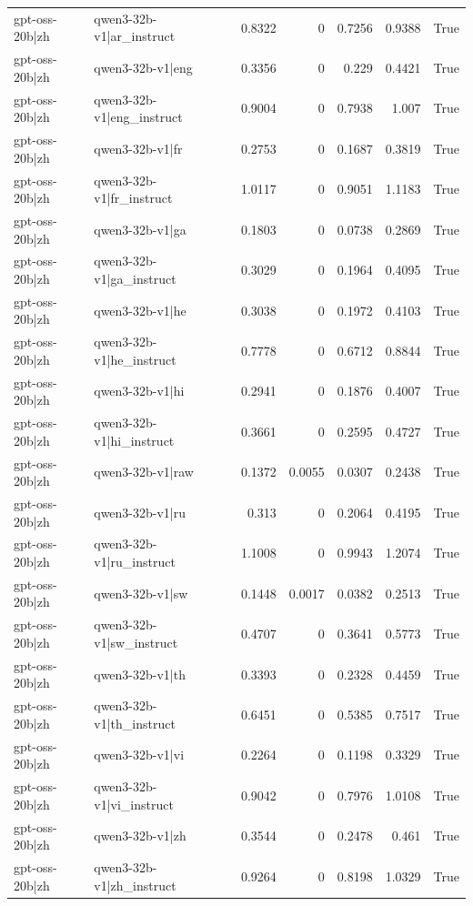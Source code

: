\begin{table}
\begin{tabular}{l l r r r r l}
gpt-oss-20b|zh & qwen3-32b-v1|ar_instruct & 0.8322 & 0 & 0.7256 & 0.9388 & True \\
gpt-oss-20b|zh & qwen3-32b-v1|eng & 0.3356 & 0 & 0.229 & 0.4421 & True \\
gpt-oss-20b|zh & qwen3-32b-v1|eng_instruct & 0.9004 & 0 & 0.7938 & 1.007 & True \\
gpt-oss-20b|zh & qwen3-32b-v1|fr & 0.2753 & 0 & 0.1687 & 0.3819 & True \\
gpt-oss-20b|zh & qwen3-32b-v1|fr_instruct & 1.0117 & 0 & 0.9051 & 1.1183 & True \\
gpt-oss-20b|zh & qwen3-32b-v1|ga & 0.1803 & 0 & 0.0738 & 0.2869 & True \\
gpt-oss-20b|zh & qwen3-32b-v1|ga_instruct & 0.3029 & 0 & 0.1964 & 0.4095 & True \\
gpt-oss-20b|zh & qwen3-32b-v1|he & 0.3038 & 0 & 0.1972 & 0.4103 & True \\
gpt-oss-20b|zh & qwen3-32b-v1|he_instruct & 0.7778 & 0 & 0.6712 & 0.8844 & True \\
gpt-oss-20b|zh & qwen3-32b-v1|hi & 0.2941 & 0 & 0.1876 & 0.4007 & True \\
gpt-oss-20b|zh & qwen3-32b-v1|hi_instruct & 0.3661 & 0 & 0.2595 & 0.4727 & True \\
gpt-oss-20b|zh & qwen3-32b-v1|raw & 0.1372 & 0.0055 & 0.0307 & 0.2438 & True \\
gpt-oss-20b|zh & qwen3-32b-v1|ru & 0.313 & 0 & 0.2064 & 0.4195 & True \\
gpt-oss-20b|zh & qwen3-32b-v1|ru_instruct & 1.1008 & 0 & 0.9943 & 1.2074 & True \\
gpt-oss-20b|zh & qwen3-32b-v1|sw & 0.1448 & 0.0017 & 0.0382 & 0.2513 & True \\
gpt-oss-20b|zh & qwen3-32b-v1|sw_instruct & 0.4707 & 0 & 0.3641 & 0.5773 & True \\
gpt-oss-20b|zh & qwen3-32b-v1|th & 0.3393 & 0 & 0.2328 & 0.4459 & True \\
gpt-oss-20b|zh & qwen3-32b-v1|th_instruct & 0.6451 & 0 & 0.5385 & 0.7517 & True \\
gpt-oss-20b|zh & qwen3-32b-v1|vi & 0.2264 & 0 & 0.1198 & 0.3329 & True \\
gpt-oss-20b|zh & qwen3-32b-v1|vi_instruct & 0.9042 & 0 & 0.7976 & 1.0108 & True \\
gpt-oss-20b|zh & qwen3-32b-v1|zh & 0.3544 & 0 & 0.2478 & 0.461 & True \\
gpt-oss-20b|zh & qwen3-32b-v1|zh_instruct & 0.9264 & 0 & 0.8198 & 1.0329 & True \\

\end{tabular}
\end{table}
